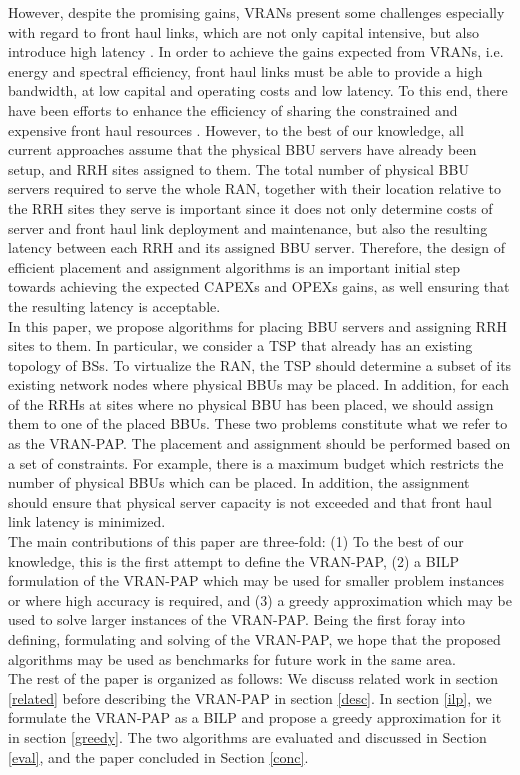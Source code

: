 \documentclass[conference]{IEEEtran}
\begin{document}
\indent However, despite the promising gains, \acp{VRAN} present some challenges especially with regard to front haul links, which are not only capital intensive, but also introduce high latency \cite{ChihLin14}. In order to achieve the gains expected from \acp{VRAN}, i.e. energy and spectral efficiency, front haul links must be able to provide a high bandwidth, at low capital and operating costs and low latency. To this end, there have been efforts to enhance the efficiency of sharing the constrained and expensive front haul resources \cite{ChihLin14, SeokPark13, LiJPeng14}. However, to the best of our knowledge, all current approaches assume that the physical BBU servers have already been setup, and \ac{RRH} sites assigned to them. The total number of physical \ac{BBU} servers required to serve the whole \ac{RAN}, together with their location relative to the \ac{RRH} sites they serve is important since it does not only determine costs of server and front haul link deployment and maintenance, but also the resulting latency between each \ac{RRH} and its assigned \ac{BBU} server. Therefore, the design of efficient placement and assignment algorithms is an important initial step towards achieving the expected \acp{CAPEX} and \acp{OPEX} gains, as well ensuring that the resulting latency is acceptable.\\
\indent In this paper, we propose algorithms for placing \ac{BBU} servers and assigning \ac{RRH} sites to them. In particular, we consider a \ac{TSP} that already has an existing topology of \acp{BS}. To virtualize the RAN, the TSP should determine a subset of its existing network nodes where physical \acp{BBU} may be placed. In addition, for each of the \acp{RRH} at sites where no physical BBU has been placed, we should assign them to one of the placed \acp{BBU}. These two problems constitute what we refer to as the \ac{VRAN-PAP}. The placement and assignment should be performed based on a set of constraints. For example, there is a maximum budget which restricts the number of physical BBUs which can be placed. In addition, the assignment should ensure that physical server capacity is not exceeded and that front haul link latency is minimized.\\
\indent The main contributions of this paper are three-fold: (1) To the best of our knowledge, this is the first attempt to define the \ac{VRAN-PAP}, (2) a \ac{BILP} formulation of the \ac{VRAN-PAP} which may be used for smaller problem instances or where high accuracy is required, and (3) a greedy approximation which may be used to solve larger instances of the \ac{VRAN-PAP}. Being the first foray into defining, formulating and solving of the \ac{VRAN-PAP}, we hope that the proposed algorithms may be used as benchmarks for future work in the same area.\\
\indent The rest of the paper is organized as follows: We discuss related work in section \ref{related} before describing the \ac{VRAN-PAP} in section \ref{desc}. In section \ref{ilp}, we formulate the \ac{VRAN-PAP} as a \ac{BILP} and propose a greedy approximation for it in section \ref{greedy}. The two algorithms are evaluated and discussed in Section \ref{eval}, and the paper concluded in Section \ref{conc}.
\end{document}
